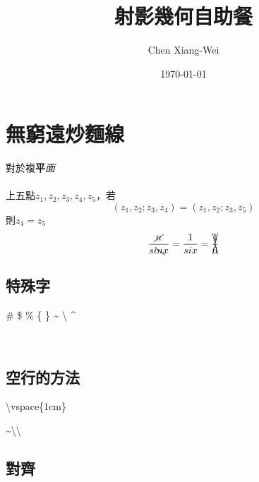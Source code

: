 \RaggedRight
\setlength{\parindent}{2em} %
\newpage

\title{射影幾何自助餐} %
\author{Chen Xiang-Wei} %

\date{\today}%
\date{\ROCtoday}%
\maketitle
\thispagestyle{fancy}
\raggedright
{}
\tableofcontents  %

\setcounter{section}{-1}

\section{無窮遠炒麵線}
\pro
{\color[RGB]{0,255,200}對於}{\color{blue}複}\textbf{平}\textit{面}
~\\%
~\\%
上五點$z_{1}, z_{2}, z_{3},z_{4},z_{5}$，若\\
\[(z_{1},z_{2};z_{3},z_{4})=(z_{1},z_{2};z_{3},z_5)\]
則$z_{4}=z_{5}$\\


\pro 
$$
\frac{\cancel{n}}{si\bcancel{n} x}=\frac{1}{six}=\xcancel{\frac{1}{6}}
$$

\subsection[short]{特殊字}

\#
\$
\%
\{
\}
\~{}
\textbackslash
\^{}

\\

\subsection{空行的方法}

\textbackslash vspace\{1cm\}
\vspace{1cm}

\~{}\textbackslash\textbackslash
~\\%

\subsection[short]{對齊}

